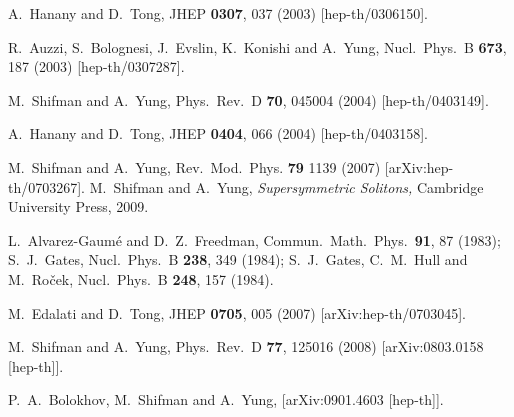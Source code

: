 \documentclass[12pt]{article}
\begin{document}
\vspace{1.5cm}
\small
\begin{thebibliography}{99}
\itemsep -2pt

A.~Hanany and D.~Tong,
JHEP {\bf 0307}, 037 (2003)
[hep-th/0306150].

R.~Auzzi, S.~Bolognesi, J.~Evslin, K.~Konishi and A.~Yung,
Nucl.\ Phys.\ B {\bf 673}, 187 (2003)
[hep-th/0307287].

M.~Shifman and A.~Yung,
Phys.\ Rev.\ D {\bf 70}, 045004 (2004)
[hep-th/0403149].

A.~Hanany and D.~Tong,
JHEP {\bf 0404}, 066 (2004)
[hep-th/0403158].

M.~Shifman and A.~Yung,
Rev.\ Mod.\ Phys. {\bf 79} 1139 (2007)
[arXiv:hep-th/0703267].
M.~Shifman and A.~Yung,
{\sl Supersymmetric Solitons,}
Cambridge University Press, 2009.

 L.~Alvarez-Gaum\'{e} and D.~Z.~Freedman,
Commun.\ Math.\ Phys.\  {\bf 91}, 87 (1983);
S.~J.~Gates,
Nucl.\ Phys.\ B {\bf 238}, 349 (1984);
S.~J.~Gates, C.~M.~Hull and M.~Ro\v{c}ek,
Nucl.\ Phys.\ B {\bf 248}, 157 (1984).

  M.~Edalati and D.~Tong,
  JHEP {\bf 0705}, 005 (2007)
  [arXiv:hep-th/0703045].

  M.~Shifman and A.~Yung,
  Phys.\ Rev.\  D {\bf 77}, 125016 (2008)
  [arXiv:0803.0158 [hep-th]].

  P.~A.~Bolokhov, M.~Shifman and A.~Yung,
  [arXiv:0901.4603 [hep-th]].
  

\end{thebibliography}
\end{document}
